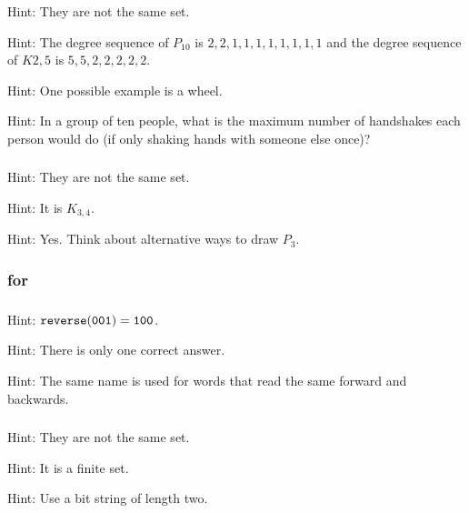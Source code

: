 \subsubsection*{ \answers}
\begin{apart}
    \item Hint: They are not the same set.
    \item Hint: The degree sequence of $P_{10}$ is $2, 2, 1, 1, 1, 1, 1, 1, 1, 1$ and the degree sequence of $K{2,5}$ is $5,5,2,2,2,2,2$.
    \item Hint: One possible example is a wheel.
    \item Hint: In a group of ten people, what is the maximum number of handshakes each person would do (if only shaking hands with someone else once)?
\end{apart}

 \subsubsection*{ \answers}
\begin{apart}
    \item Hint: They are not the same set.
    \item Hint: It is $K_{3,4}$.
    \item Hint: Yes.  Think about alternative ways to draw $P_3$.
\end{apart}

\subsubsection{\answers for 
\subbitstringfunctions}

\subsubsection*{ \answers}
\begin{apart}
    \item Hint: $\texttt{reverse}(\texttt{001})=\texttt{100}$.
    \item Hint: There is only one correct answer.
    \item Hint: The same name is used for words that read the same forward and backwards.
\end{apart}

\subsubsection*{ \answers}
\begin{apart}
    \item {}
    \item Hint: They are not the same set.
    \item Hint: It is a finite set.
    \item Hint: Use a bit string of length two.
\end{apart}

